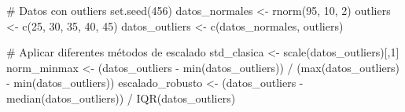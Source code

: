 \documentclass[
  letterpaper,
  DIV=11,
  numbers=noendperiod]{scrreprt}
\newenvironment{Shaded}{\begin{snugshade}}{\end{snugshade}}
\newcommand{\CommentTok}[1]{\textcolor[rgb]{0.37,0.37,0.37}{#1}}
\newcommand{\DecValTok}[1]{\textcolor[rgb]{0.68,0.00,0.00}{#1}}
\newcommand{\FunctionTok}[1]{\textcolor[rgb]{0.28,0.35,0.67}{#1}}
\newcommand{\NormalTok}[1]{\textcolor[rgb]{0.00,0.23,0.31}{#1}}
\newcommand{\OtherTok}[1]{\textcolor[rgb]{0.00,0.23,0.31}{#1}}
\newcommand{\SpecialCharTok}[1]{\textcolor[rgb]{0.37,0.37,0.37}{#1}}
\begin{document}
\begin{tcolorbox}[enhanced jigsaw, leftrule=.75mm, breakable, colbacktitle=quarto-callout-tip-color!10!white, bottomrule=.15mm, colframe=quarto-callout-tip-color-frame, toprule=.15mm, colback=white, coltitle=black, bottomtitle=1mm, left=2mm, title=\textcolor{quarto-callout-tip-color}{\faLightbulb}\hspace{0.5em}{Ejemplo con outliers: Escalado robusto}, opacityback=0, arc=.35mm, opacitybacktitle=0.6, toptitle=1mm, titlerule=0mm, rightrule=.15mm]

\begin{Shaded}
\begin{Highlighting}[]
\CommentTok{\# Datos con outliers}
\FunctionTok{set.seed}\NormalTok{(}\DecValTok{456}\NormalTok{)}
\NormalTok{datos\_normales }\OtherTok{\textless{}{-}} \FunctionTok{rnorm}\NormalTok{(}\DecValTok{95}\NormalTok{, }\DecValTok{10}\NormalTok{, }\DecValTok{2}\NormalTok{)}
\NormalTok{outliers }\OtherTok{\textless{}{-}} \FunctionTok{c}\NormalTok{(}\DecValTok{25}\NormalTok{, }\DecValTok{30}\NormalTok{, }\DecValTok{35}\NormalTok{, }\DecValTok{40}\NormalTok{, }\DecValTok{45}\NormalTok{)}
\NormalTok{datos\_outliers }\OtherTok{\textless{}{-}} \FunctionTok{c}\NormalTok{(datos\_normales, outliers)}

\CommentTok{\# Aplicar diferentes métodos de escalado}
\NormalTok{std\_clasica }\OtherTok{\textless{}{-}} \FunctionTok{scale}\NormalTok{(datos\_outliers)[,}\DecValTok{1}\NormalTok{]}
\NormalTok{norm\_minmax }\OtherTok{\textless{}{-}}\NormalTok{ (datos\_outliers }\SpecialCharTok{{-}} \FunctionTok{min}\NormalTok{(datos\_outliers)) }\SpecialCharTok{/}\NormalTok{ (}\FunctionTok{max}\NormalTok{(datos\_outliers) }\SpecialCharTok{{-}} \FunctionTok{min}\NormalTok{(datos\_outliers))}
\NormalTok{escalado\_robusto }\OtherTok{\textless{}{-}}\NormalTok{ (datos\_outliers }\SpecialCharTok{{-}} \FunctionTok{median}\NormalTok{(datos\_outliers)) }\SpecialCharTok{/} \FunctionTok{IQR}\NormalTok{(datos\_outliers)}


\end{Highlighting}
\end{Shaded}
\end{tcolorbox}
\end{document}
